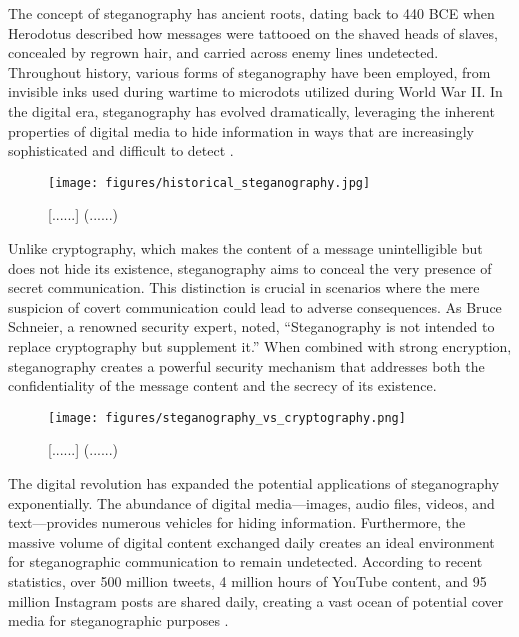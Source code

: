 \documentclass[12pt, a4paper, oneside]{book}
\begin{document}
The concept of steganography has ancient roots, dating back to 440 BCE when Herodotus described how messages were tattooed on the shaved heads of slaves, concealed by regrown hair, and carried across enemy lines undetected. Throughout history, various forms of steganography have been employed, from invisible inks used during wartime to microdots utilized during World War II. In the digital era, steganography has evolved dramatically, leveraging the inherent properties of digital media to hide information in ways that are increasingly sophisticated and difficult to detect \cite{JohnsonSmith2023}.

\begin{figure}[htbp]
    \centering
    \texttt{[image: figures/historical\_steganography.jpg]}
    \caption{[......] (......)}
    \label{fig:historical_steganography}
\end{figure}

Unlike cryptography, which makes the content of a message unintelligible but does not hide its existence, steganography aims to conceal the very presence of secret communication. This distinction is crucial in scenarios where the mere suspicion of covert communication could lead to adverse consequences. As Bruce Schneier, a renowned security expert, noted, \enquote{Steganography is not intended to replace cryptography but supplement it.} When combined with strong encryption, steganography creates a powerful security mechanism that addresses both the confidentiality of the message content and the secrecy of its existence.

\begin{figure}[htbp]
    \centering
    \texttt{[image: figures/steganography\_vs\_cryptography.png]}
    \caption{[......] (......)}
    \label{fig:stego_vs_crypto}
\end{figure}

The digital revolution has expanded the potential applications of steganography exponentially. The abundance of digital media—images, audio files, videos, and text—provides numerous vehicles for hiding information. Furthermore, the massive volume of digital content exchanged daily creates an ideal environment for steganographic communication to remain undetected. According to recent statistics, over 500 million tweets, 4 million hours of YouTube content, and 95 million Instagram posts are shared daily, creating a vast ocean of potential cover media for steganographic purposes \cite{CybersecurityVenture2024}.
\end{document}

